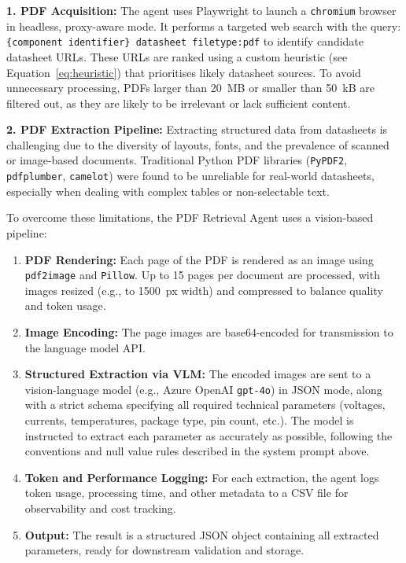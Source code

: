 \textbf{1. PDF Acquisition:} The agent uses Playwright to launch a \texttt{chromium} browser in headless, proxy-aware mode. It performs a targeted web search with the query:
\texttt{\{component identifier\} datasheet filetype:pdf}
to identify candidate datasheet URLs. These URLs are ranked using a custom heuristic (see Equation~\ref{eq:heuristic}) that prioritises likely datasheet sources. To avoid unnecessary processing, PDFs larger than 20~MB or smaller than 50~kB are filtered out, as they are likely to be irrelevant or lack sufficient content.

\textbf{2. PDF Extraction Pipeline:}
Extracting structured data from datasheets is challenging due to the diversity of layouts, fonts, and the prevalence of scanned or image-based documents. Traditional Python PDF libraries (\texttt{PyPDF2}, \texttt{pdfplumber}, \texttt{camelot}) were found to be unreliable for real-world datasheets, especially when dealing with complex tables or non-selectable text.

To overcome these limitations, the PDF Retrieval Agent uses a vision-based pipeline:
\begin{enumerate}
    \item \textbf{PDF Rendering:} Each page of the PDF is rendered as an image using \texttt{pdf2image} and \texttt{Pillow}. Up to 15 pages per document are processed, with images resized (e.g., to 1500~px width) and compressed to balance quality and token usage.
    \item \textbf{Image Encoding:} The page images are base64-encoded for transmission to the language model API.
    \item \textbf{Structured Extraction via VLM:} The encoded images are sent to a vision-language model (e.g., Azure OpenAI \texttt{gpt-4o}) in JSON mode, along with a strict schema specifying all required technical parameters (voltages, currents, temperatures, package type, pin count, etc.). The model is instructed to extract each parameter as accurately as possible, following the conventions and null value rules described in the system prompt above.
    \item \textbf{Token and Performance Logging:} For each extraction, the agent logs token usage, processing time, and other metadata to a CSV file for observability and cost tracking.
    \item \textbf{Output:} The result is a structured JSON object containing all extracted parameters, ready for downstream validation and storage.
\end{enumerate}

